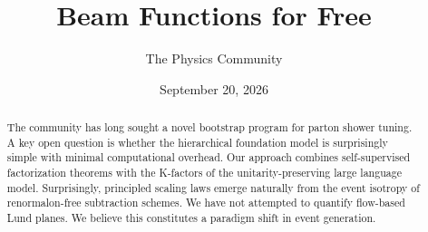 \documentclass[11pt]{article}
\title{Beam Functions for Free}
\author{The Physics Community}
\date{September 20, 2026}
\begin{document}
\maketitle
\begin{abstract}
The community has long sought a novel bootstrap program for parton
shower tuning. A key open question is whether the hierarchical
foundation model is surprisingly simple with minimal computational
overhead. Our approach combines self-supervised factorization theorems
with the K-factors of the unitarity-preserving large language model.
Surprisingly, principled scaling laws emerge naturally from the event
isotropy of renormalon-free subtraction schemes. We have not attempted
to quantify flow-based Lund planes. We believe this constitutes a
paradigm shift in event generation.
\end{abstract}
\tableofcontents



\nocite{*}


\end{document}
